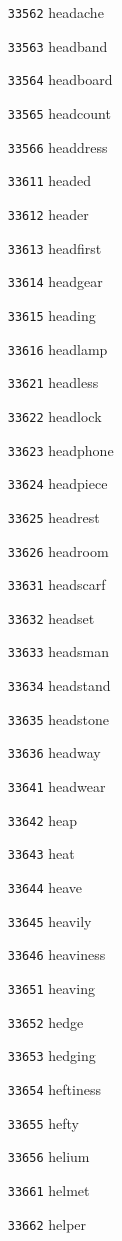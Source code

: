 \documentclass[twoside,11pt]{article}
\begin{document}
\begin{multicols}{5}
\begin{enumerate}
\item[\texttt{33562}] headache
\item[\texttt{33563}] headband
\item[\texttt{33564}] headboard
\item[\texttt{33565}] headcount
\item[\texttt{33566}] headdress
\item[\texttt{33611}] headed
\item[\texttt{33612}] header
\item[\texttt{33613}] headfirst
\item[\texttt{33614}] headgear
\item[\texttt{33615}] heading
\item[\texttt{33616}] headlamp
\item[\texttt{33621}] headless
\item[\texttt{33622}] headlock
\item[\texttt{33623}] headphone
\item[\texttt{33624}] headpiece
\item[\texttt{33625}] headrest
\item[\texttt{33626}] headroom
\item[\texttt{33631}] headscarf
\item[\texttt{33632}] headset
\item[\texttt{33633}] headsman
\item[\texttt{33634}] headstand
\item[\texttt{33635}] headstone
\item[\texttt{33636}] headway
\item[\texttt{33641}] headwear
\item[\texttt{33642}] heap
\item[\texttt{33643}] heat
\item[\texttt{33644}] heave
\item[\texttt{33645}] heavily
\item[\texttt{33646}] heaviness
\item[\texttt{33651}] heaving
\item[\texttt{33652}] hedge
\item[\texttt{33653}] hedging
\item[\texttt{33654}] heftiness
\item[\texttt{33655}] hefty
\item[\texttt{33656}] helium
\item[\texttt{33661}] helmet
\item[\texttt{33662}] helper

\end{enumerate}
\end{multicols}
\end{document}
